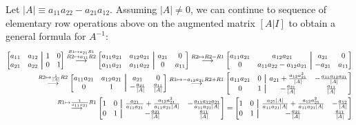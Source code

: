 \documentclass[12pt,letterpaper,reqno]{article}
\numberwithin{equation}{section}
\newcommand\aug{\fboxsep=-\fboxrule\!\!\!\fbox{\strut}\!\!\!}
\begin{document}
Let $|A|\equiv a_{11}a_{22}-a_{21}a_{12}$. Assuming $|A| \neq 0$, we can continue to sequence of elementary row operations above on the augmented matrix $[A|I]$ to obtain a general formula for $A^{-1}$:
\begin{align*}
	\begin{bmatrix}
		a_{11} & a_{12} & \aug & 1 & 0 \\
		a_{21} & a_{22} & \aug & 0 & 1 
	\end{bmatrix} \stackrel{\stackrel{R1 \mapsto a_{21}R1}{R2 \mapsto a_{11}R2}}{\longrightarrow} \begin{bmatrix}
		a_{11}a_{21} & a_{12}a_{21} & \aug & a_{21} & 0 \\
		a_{11}a_{21} & a_{11}a_{22} & \aug & 0 & a_{11}
	\end{bmatrix} \stackrel{R2 \mapsto R2-R1}{\longrightarrow} \begin{bmatrix}
		a_{11}a_{21} & a_{12}a_{21} & \aug & a_{21} & 0 \\
		0 & a_{11}a_{22}-a_{12}a_{21} & \aug & -a_{21} & a_{11}
	\end{bmatrix} \\
	\stackrel{R2 \mapsto \frac{1}{|A|}R2}{\longrightarrow}\begin{bmatrix}
		a_{11}a_{21} & a_{12}a_{21} & \aug & a_{21} & 0 \\
		0 & 1 & \aug & -\frac{a_{21}}{|A|} & \frac{a_{11}}{|A|}
	\end{bmatrix} \stackrel{R1 \mapsto -a_{12}a_{21}R2+R1}{\longrightarrow} \begin{bmatrix}
		a_{11}a_{21} & 0 & \aug & a_{21}+\frac{a_{12}a_{21}^2}{|A|} & -\frac{a_{11}a_{12}a_{21}}{|A|} \\
		0 & 1 & \aug & -\frac{a_{21}}{|A|} & \frac{a_{11}}{|A|} \end{bmatrix} \\
		\stackrel{R1 \mapsto \frac{1}{a_{11}a_{21}}R1}{\longrightarrow}
	 \begin{bmatrix}
		1 & 0 & \aug & \frac{a_{21}}{a_{11}a_{21}}+\frac{a_{12}a_{21}^2}{a_{11}a_{21}|A|} & -\frac{a_{11}a_{12}a_{21}}{a_{11}a_{21}|A|} \\
		0 & 1 & \aug & -\frac{a_{21}}{|A|} & \frac{a_{11}}{|A|} 
	\end{bmatrix}= \begin{bmatrix}
		1 & 0 & \aug & \frac{a_{21}|A|}{a_{11}a_{21}|A|}+\frac{a_{12}a_{21}^2}{a_{11}a_{21}|A|} & -\frac{a_{12}}{|A|} \\
		0 & 1 & \aug & -\frac{a_{21}}{|A|} & \frac{a_{11}}{|A|} 
	\end{bmatrix} \\

\end{align*}
\end{document}
